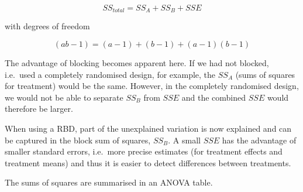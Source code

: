\documentclass[
  letterpaper,
]{book}
\begin{document}
\[
SS_{total} = SS_A + SS_B + SSE
\]

with degrees of freedom

\[
(ab - 1) = (a - 1) + (b - 1) + (a - 1)(b - 1)
\]

The advantage of blocking becomes apparent here. If we had not blocked,
i.e.~used a completely randomised design, for example, the \(SS_A\)
(sums of squares for treatment) would be the same. However, in the
completely randomised design, we would not be able to separate \(SS_B\)
from \(SSE\) and the combined \(SSE\) would therefore be larger.

When using a RBD, part of the unexplained variation is now explained and
can be captured in the block sum of squares, \(SS_B\). A small \(SSE\)
has the advantage of smaller standard errors, i.e.~more precise
estimates (for treatment effects and treatment means) and thus it is
easier to detect differences between treatments.


The sums of squares are summarised in an ANOVA table.
\end{document}
